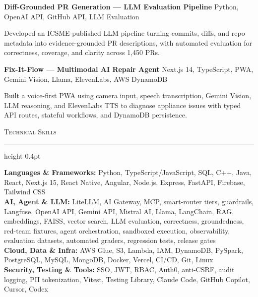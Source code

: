 \documentclass[letterpaper,11pt]{article}
\newcommand{\resumesection}[1]{%
  \par\vspace{2pt}%
  {\large\scshape #1}\par\vspace{2pt}%
  \hrule height 0.4pt\vspace{2pt}%
}
\newcommand{\projectHeading}[2]{
  \textbf{#1} \hfill #2
}
\begin{document}
\vspace{-4pt}
\projectHeading{Diff-Grounded PR Generation — LLM Evaluation Pipeline}{Python, OpenAI API, GitHub API, LLM Evaluation}
\begin{tightitemize}
  \item Developed an ICSME-published LLM pipeline turning commits, diffs, and repo metadata into evidence-grounded PR descriptions, with automated evaluation for correctness, coverage, and clarity across 1,450 PRs.
\end{tightitemize}

\vspace{-4pt}
\projectHeading{Fix-It-Flow — Multimodal AI Repair Agent}{Next.js 14, TypeScript, PWA, Gemini Vision, Llama, ElevenLabs, AWS DynamoDB}
\begin{tightitemize}
  \item Built a voice-first PWA using camera input, speech transcription, Gemini Vision, LLM reasoning, and ElevenLabs TTS to diagnose appliance issues with typed API routes, stateful workflows, and DynamoDB persistence.
\end{tightitemize}

\resumesection{Technical Skills}
\textbf{Languages \& Frameworks:} Python, TypeScript/JavaScript, SQL, C++, Java, React, Next.js 15, React Native, Angular, Node.js, Express, FastAPI, Firebase, Tailwind CSS\\
\textbf{AI, Agent \& LLM:} LiteLLM, AI Gateway, MCP, smart-router tiers, guardrails, Langfuse, OpenAI API, Gemini API, Mistral AI, Llama, LangChain, RAG, embeddings, FAISS, vector search, LLM evaluation, correctness, groundedness, red-team fixtures, agent orchestration, sandboxed execution, observability, evaluation datasets, automated graders, regression tests, release gates\\
\textbf{Cloud, Data \& Infra:} AWS Glue, S3, Lambda, IAM, DynamoDB, PySpark, PostgreSQL, MySQL, MongoDB, Docker, Vercel, CI/CD, Git, Linux\\
\textbf{Security, Testing \& Tools:} SSO, JWT, RBAC, Auth0, anti-CSRF, audit logging, PII tokenization, Vitest, Testing Library, Claude Code, GitHub Copilot, Cursor, Codex
\end{document}
